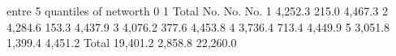	entre		
5 quantiles of networth 	0	1	Total
	No.	No.	No.
1	4,252.3	215.0	4,467.3
2	4,284.6	153.3	4,437.9
3	4,076.2	377.6	4,453.8
4	3,736.4	713.4	4,449.9
5	3,051.8	1,399.4	4,451.2
Total	19,401.2	2,858.8	22,260.0


